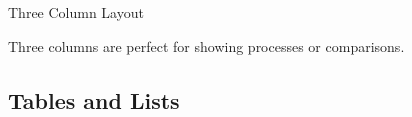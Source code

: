 \documentclass[10pt,aspectratio=1610]{beamer}
\begin{document}
\begin{frame}{Three Column Layout}
    \begin{threecolumns}
    \end{threecolumns}
    
    \vspace{0.5em}
    
    \begin{lightbox}
        Three columns are perfect for showing processes or comparisons.
    \end{lightbox}
\end{frame}

\subsection{Tables and Lists}
\end{document}
